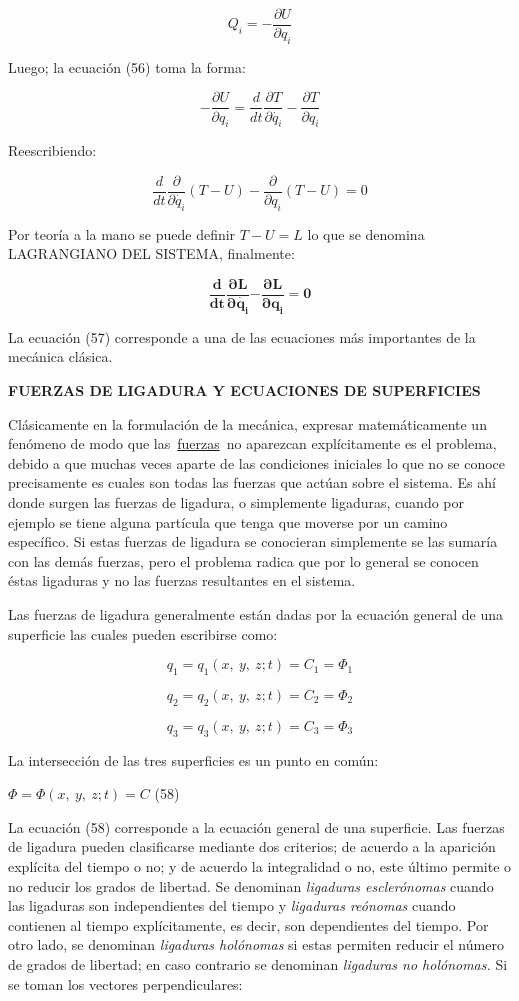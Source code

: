 \documentclass[]{article}
\begin{document}
\[Q_{i} = - \frac{\partial U}{\partial q_{i}}\]

Luego; la ecuación (56) toma la forma:

\[- \frac{\partial U}{\partial q_{i}} = \frac{d}{dt}\frac{\partial T}{\partial\dot{q_{i}}} - \frac{\partial T}{\partial q_{i}}\]

Reescribiendo:

\[\frac{d}{dt}\frac{\partial}{\partial\dot{q_{i}}}(T - U) - \frac{\partial}{\partial q_{i}}(T - U) = 0\]

Por teoría a la mano se puede definir \(T - U = L\) lo que se denomina
LAGRANGIANO DEL SISTEMA, finalmente:

\[\frac{\mathbf{d}}{\mathbf{dt}}\frac{\mathbf{\partial L}}{\mathbf{\partial}\dot{\mathbf{q}_{\mathbf{i}}}}\mathbf{-}\frac{\mathbf{\partial L}}{\mathbf{\partial}\mathbf{q}_{\mathbf{i}}}\mathbf{= 0}\]

La ecuación (57) corresponde a una de las ecuaciones más importantes de
la mecánica clásica.

\textbf{FUERZAS DE LIGADURA Y ECUACIONES DE SUPERFICIES}

Clásicamente en la formulación de la mecánica, expresar matemáticamente
un fenómeno de modo que
las~\href{https://es.wikipedia.org/wiki/Fuerza}{fuerzas}~no aparezcan
explícitamente es el problema, debido a que muchas veces aparte de las
condiciones iniciales lo que no se conoce precisamente es cuales son
todas las fuerzas que actúan sobre el sistema. Es ahí donde surgen las
fuerzas de ligadura, o simplemente ligaduras, cuando por ejemplo se
tiene alguna partícula que tenga que moverse por un camino específico.
Si estas fuerzas de ligadura se conocieran simplemente se las sumaría
con las demás fuerzas, pero el problema radica que por lo general se
conocen éstas ligaduras y no las fuerzas resultantes en el sistema.

Las fuerzas de ligadura generalmente están dadas por la ecuación general
de una superficie las cuales pueden escribirse como:

\[q_{1} = q_{1}(x,\ y,\ z;t) = C_{1} = \Phi_{1}\]

\[q_{2} = q_{2}(x,\ y,\ z;t) = C_{2} = \Phi_{2}\]

\[q_{3} = q_{3}(x,\ y,\ z;t) = C_{3} = \Phi_{3}\]

La intersección de las tres superficies es un punto en común:

\(\Phi = \Phi(x,\ y,\ z;t) = C\) (58)

La ecuación (58) corresponde a la ecuación general de una superficie.
Las fuerzas de ligadura pueden clasificarse mediante dos criterios; de
acuerdo a la aparición explícita del tiempo o no; y de acuerdo la
integralidad o no, este último permite o no reducir los grados de
libertad. Se denominan \emph{ligaduras esclerónomas} cuando las
ligaduras son independientes del tiempo y \emph{ligaduras reónomas}
cuando contienen al tiempo explícitamente, es decir, son dependientes
del tiempo. Por otro lado, se denominan \emph{ligaduras holónomas} si
estas permiten reducir el número de grados de libertad; en caso
contrario se denominan \emph{ligaduras no holónomas.} Si se toman los
vectores perpendiculares:
\end{document}
